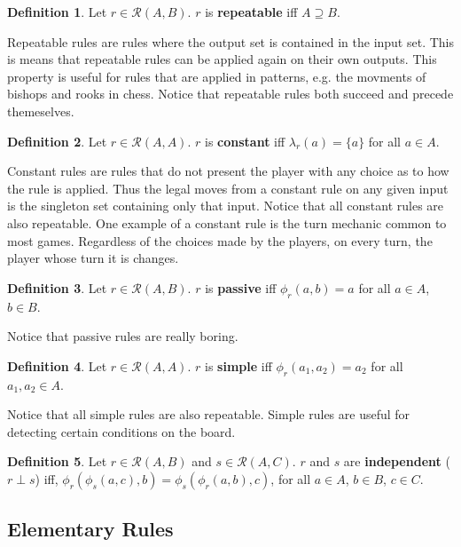 \documentclass{article}
\theoremstyle{definition}
\newtheorem{definition}{Definition}[subsection]
\theoremstyle{plain}
\def\rule{\mathcal{R}}
\begin{document}
\begin{definition} 
  Let $ r \in \rule (A, B) $. $ r $ is \textbf{repeatable} iff $ A \supseteq B $.
\end{definition}

Repeatable rules are rules where the output set is contained in the input set.
This is means that repeatable rules can be applied again on their own outputs.
This property is useful for rules that are applied in patterns,
e.g. the movments of bishops and rooks in chess.
Notice that repeatable rules both succeed and precede themeselves.

\begin{definition}
  Let $ r \in \rule (A, A) $. $ r $ is \textbf{constant} iff $ \lambda_r (a) = \{ a \} $ for all $ a \in A $.
\end{definition}

Constant rules are rules that do not present the player with any choice as to how the rule is applied.
Thus the legal moves from a constant rule on any given input is the singleton set containing only that input.
Notice that all constant rules are also repeatable.
One example of a constant rule is the turn mechanic common to most games.
Regardless of the choices made by the players,
on every turn, the player whose turn it is changes.

\begin{definition}
  Let $ r \in \rule (A, B) $. $ r $ is \textbf{passive} iff $ \phi_r (a, b) = a $ for all $ a \in A $, $ b \in B $.
\end{definition}

Notice that passive rules are really boring.

\begin{definition}
  Let $ r \in \rule (A, A) $. $ r $ is \textbf{simple} iff $ \phi_r (a_1, a_2) = a_2 $ for all $ a_1, a_2 \in A $.
\end{definition}

Notice that all simple rules are also repeatable.
Simple rules are useful for detecting certain conditions on the board.

\begin{definition}
  Let $ r \in \rule (A, B) $
  and $ s \in \rule (A, C) $.
  $r$ and $s$ are \textbf{independent} ($ r \perp s $) iff,
  $ \phi_r (\phi_s (a, c), b) = \phi_s (\phi_r (a, b), c) $, 
  for all $ a \in A $, $ b \in B $, $ c \in C $.
\end{definition}

\subsection{Elementary Rules} %
\end{document}
